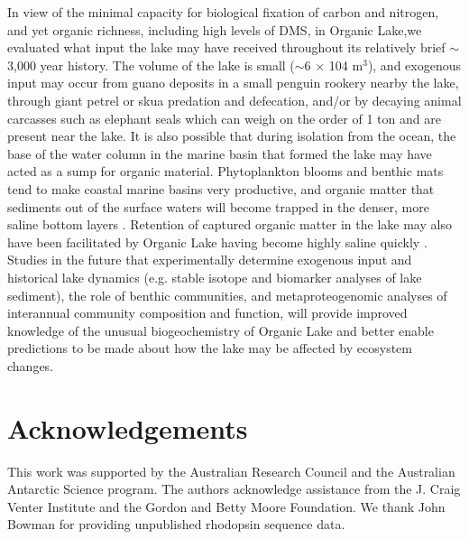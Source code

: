 In view of the minimal capacity for biological fixation of carbon and nitrogen, and yet organic richness, including high levels of \ac{DMS}, in Organic Lake,we evaluated what input the lake may have received throughout its relatively brief $\sim$3,000 year history. 
The volume of the lake is small ($\sim$6 $\times$ 104 m$^3$), and exogenous input may occur from guano deposits in a small penguin rookery nearby the lake, through giant petrel or skua predation and defecation, and/or by decaying animal carcasses such as elephant seals which can weigh on the order of 1 ton and are present near the lake. 
It is also possible that during isolation from the ocean, the base of the water column in the marine basin that formed the lake may have acted as a sump for organic material. 
Phytoplankton blooms and benthic mats tend to make coastal marine basins very productive, and organic matter that sediments out of the surface waters will become trapped in the denser, more saline bottom layers \cite{Bird1991}. 
Retention of captured organic matter in the lake may also have been facilitated by Organic Lake having become highly saline quickly \cite{Bird1991}. 
Studies in the future that experimentally determine exogenous input and historical lake dynamics (e.g. stable isotope and biomarker analyses of lake sediment), the role of benthic communities, and metaproteogenomic analyses of interannual community composition and function, will provide improved knowledge of the unusual biogeochemistry of Organic Lake and better enable predictions to be made about how the lake may be affected by ecosystem changes.


\section{Acknowledgements}
This work was supported by the Australian Research Council and the Australian Antarctic Science program. 
The authors acknowledge assistance from the J. Craig Venter Institute and the Gordon and Betty Moore Foundation. 
We thank John Bowman for providing unpublished rhodopsin sequence data.
